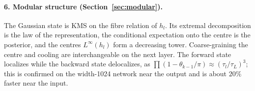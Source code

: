 \paragraph{6. Modular structure (Section~\ref{sec:modular}).} The Gaussian state is KMS on the fibre relation of $h_l$. Its extremal
decomposition is the law of the representation, the conditional expectation onto the centre is the posterior, and the centres
$L^\infty(h_l)$ form a decreasing tower. Coarse-graining the centre and cooling are interchangeable on the next layer. The forward state
localizes while the backward state delocalizes, as $\prod(1-\theta_{k-1}/\pi)\approx(\tau_l/\tau_L)^3$; this is confirmed on the width-1024
network near the output and is about $20\%$ faster near the input.
